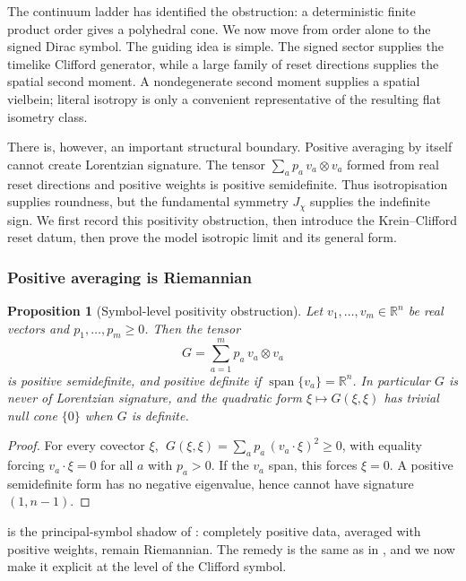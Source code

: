 \documentclass[11pt]{article}
\newtheorem{proposition}[theorem]{Proposition}
\theoremstyle{definition}
\theoremstyle{remark}
\newcommand{\R}{\mathbb{R}}
\newcommand{\spn}{\operatorname{span}}
\begin{document}
The continuum ladder has identified the obstruction: a deterministic finite
product order gives a polyhedral cone.  We now move from order alone to the
signed Dirac symbol.  The guiding idea is simple.  The signed sector supplies
the timelike Clifford generator, while a large family of reset directions
supplies the spatial second moment.  A nondegenerate second moment supplies a spatial vielbein; literal isotropy is only a convenient representative of the resulting flat isometry class.

There is, however, an important structural boundary.  Positive averaging by
itself cannot create Lorentzian signature.  The tensor
$\sum_a p_a\,v_a\otimes v_a$ formed from real reset directions and positive
weights is positive semidefinite.  Thus isotropisation supplies roundness, but
the fundamental symmetry $J_\chi$ supplies the indefinite sign.  We first record
this positivity obstruction, then introduce the Krein--Clifford reset datum,
then prove the model isotropic limit and its general form.

\subsubsection{Positive averaging is Riemannian}

\begin{proposition}[Symbol-level positivity obstruction]
\label{prop:positive-averaging}
Let $v_1,\dots,v_m\in\R^{n}$ be real vectors and $p_1,\dots,p_m\ge0$.  Then the
tensor
\[
  G=\sum_{a=1}^m p_a\,v_a\otimes v_a
\]
is positive semidefinite, and positive definite if $\spn\{v_a\}=\R^{n}$.  In
particular $G$ is never of Lorentzian signature, and the quadratic form
$\xi\mapsto G(\xi,\xi)$ has trivial null cone $\{0\}$ when $G$ is definite.
\end{proposition}

\begin{proof}
For every covector $\xi$, $\;G(\xi,\xi)=\sum_a p_a\,(v_a\cdot\xi)^2\ge0$, with
equality forcing $v_a\cdot\xi=0$ for all $a$ with $p_a>0$.  If the $v_a$ span,
this forces $\xi=0$.  A positive semidefinite form has no negative eigenvalue,
hence cannot have signature $(1,n-1)$.
\end{proof}

 is the principal-symbol shadow of
: completely positive data, averaged with
positive weights, remain Riemannian.  The remedy is the same as in
, and we now make it explicit at the level of the Clifford
symbol.
\end{document}
